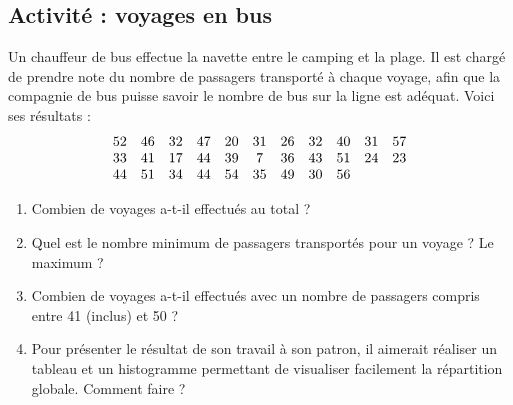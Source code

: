 
\subsection*{Activité : voyages en bus}

Un chauffeur de bus effectue la navette entre le camping et la plage. Il est chargé de prendre note du nombre de passagers transporté à chaque voyage, afin que la compagnie de bus puisse savoir le nombre de bus sur la ligne est adéquat. Voici ses résultats :
\begin{equation}
\begin{array}[]{ccccccccccc}
52& 46& 32& 47& 20& 31& 26& 32& 40& 31& 57\\
33& 41& 17& 44& 39& 7& 36& 43& 51& 24& 23\\
44& 51& 34& 44& 54& 35& 49& 30& 56&
\end{array}
\end{equation}

\begin{enumerate}
    \item
 Combien de voyages a-t-il effectués au total ?
 \item
 Quel est le nombre minimum de passagers transportés pour un voyage ? Le maximum ?
\item
 Combien de voyages a-t-il effectués avec un nombre de passagers compris entre 41 (inclus) et 50 ?
\item
 Pour présenter le résultat de son travail à son patron, il aimerait réaliser un tableau et un histogramme permettant de visualiser facilement la répartition globale. Comment faire ?
\end{enumerate}
